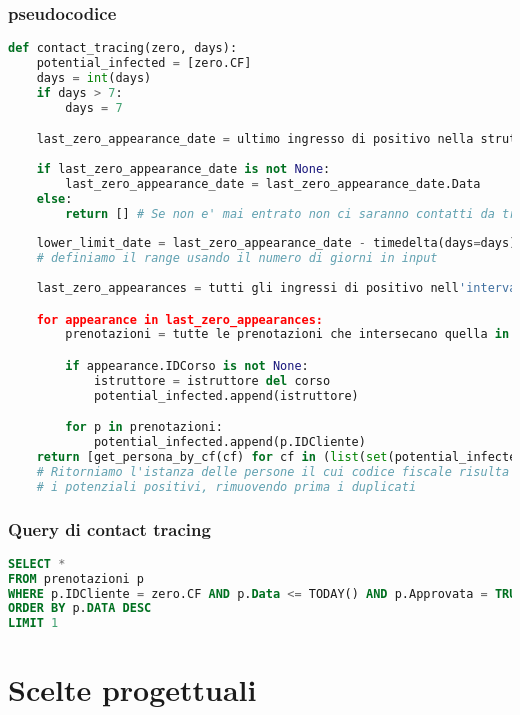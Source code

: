 \documentclass[a4paper,11pt,titlepage]{article}
\begin{document}
\subsubsection{pseudocodice}
\begin{lstlisting}[language=Python]
def contact_tracing(zero, days):
    potential_infected = [zero.CF]
    days = int(days)
    if days > 7:
        days = 7

    last_zero_appearance_date = ultimo ingresso di positivo nella struttura
    
    if last_zero_appearance_date is not None:
        last_zero_appearance_date = last_zero_appearance_date.Data
    else:
        return [] # Se non e' mai entrato non ci saranno contatti da tracciare
        
    lower_limit_date = last_zero_appearance_date - timedelta(days=days)
    # definiamo il range usando il numero di giorni in input
    
    last_zero_appearances = tutti gli ingressi di positivo nell'intervallo

    for appearance in last_zero_appearances:
        prenotazioni = tutte le prenotazioni che intersecano quella in esame

        if appearance.IDCorso is not None:
            istruttore = istruttore del corso
            potential_infected.append(istruttore)

        for p in prenotazioni:
            potential_infected.append(p.IDCliente)
    return [get_persona_by_cf(cf) for cf in (list(set(potential_infected)))]
    # Ritorniamo l'istanza delle persone il cui codice fiscale risulta tra
    # i potenziali positivi, rimuovendo prima i duplicati
\end{lstlisting}
\subsubsection{Query di contact tracing}
\begin{lstlisting}[language=SQL]
SELECT *
FROM prenotazioni p
WHERE p.IDCliente = zero.CF AND p.Data <= TODAY() AND p.Approvata = TRUE
ORDER BY p.DATA DESC
LIMIT 1
\end{lstlisting}

\section{Scelte progettuali}
\end{document}
